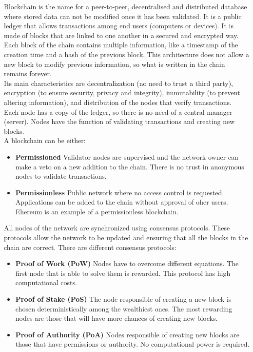 \documentclass[10pt]{article}
\begin{document}
\begin{multicols}{2}
Blockchain is the name for a peer-to-peer, decentralised and distributed database where stored data can not be modified once it has been validated. It is a public ledger that allows transactions among end users (computers or devices). It is made of blocks that are linked to one another in a secured and encrypted way. Each block of the chain contains multiple information, like a timestamp of the creation time and a hash of the previous block. This architecture does not allow a new block to modify previous information, so what is written in the chain remains forever.\\

Its main characteristics are decentralization (no need to trust a third party), encryption (to ensure security, privacy and integrity), immutability (to prevent altering information), and distribution of the nodes that verify transactions.\\

Each node has a copy of the ledger, so there is no need of a central manager (server). Nodes have the function of validating transactions and creating new blocks.\\

A blockchain can be either:

\begin{itemize}
	\item \textbf{Permissioned} Validator nodes are supervised and the network owner can make a veto on a new addition to the chain. There is no trust in anonymous nodes to validate transactions.
	\item \textbf{Permissionless} Public network where no access control is requested. Applications can be added to the chain without approval of oher users. Ehereum is an example of a permissionless blockchain.
\end{itemize}

All nodes of the network are synchronized using consensus protocols. These protocols allow the network to be updated and ensuring that all the blocks in the chain are correct. There are different consensus protocols:

\begin{itemize}
	\item \textbf{Proof of Work (PoW)} Nodes have to overcome different equations. The first node that is able to solve them is rewarded. This protocol has high computational costs.
	\item \textbf{Proof of Stake (PoS)} The node responsible of creating a new block is chosen deterministically among the wealthiest ones. The most rewarding nodes are those that will have more chances of creating new blocks.
	\item \textbf{Proof of Authority (PoA)} Nodes responsible of creating new blocks are those that have permissions or authority. No computational power is required.
\end{itemize}


\end{multicols}
\end{document}
